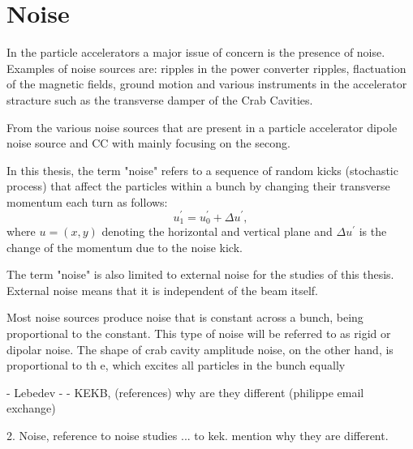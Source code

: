 \section{Noise}\label{sec:noise_definition}
In the particle accelerators a major issue of concern is the presence of noise. Examples of noise sources are: ripples in the power converter ripples, flactuation of the magnetic fields, ground motion and various instruments in the accelerator stracture such as the transverse damper of the Crab Cavities.




From the various noise sources that are present in a particle accelerator dipole noise source and CC with mainly focusing on the secong.


In this thesis, the term "noise" refers to a sequence of random kicks (stochastic process) that affect the particles within a bunch by changing their transverse momentum each turn as follows: %
\begin{equation}\label{eq:external_noise}
    u^\prime_1 =  u^\prime_0 + \Delta u^\prime,
\end{equation}
where $u=(x,y)$ denoting the horizontal and vertical plane and $\Delta u^\prime$ is the change of the momentum due to the noise kick. 

The term "noise" is also limited to external noise for the studies of this thesis. External noise means that it is independent of the beam itself.


Most noise sources produce noise that is constant across a bunch, being proportional to the constant. This type of noise will be referred to as rigid or dipolar noise. The shape of crab cavity amplitude noise, on the
other hand, is proportional to th
e, which excites all particles in the bunch equally




- Lebedev
- 
- KEKB, (references) why are they different (philippe email exchange)

2. Noise, reference to noise studies ... to kek. mention why they are different.\\


